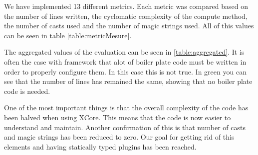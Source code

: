 		We have implemented 13 different metrics. Each metric was compared based on
the number of lines written, the cyclomatic complexity of the compute method,
the number of casts used and the number of magic strings used. All of this
values can be seen in table \ref{table:metricMesure}.

		The aggregated values of the evaluation can be seen in \ref{table:aggregated}. 
It is often the case with framework that alot of boiler plate code must be
written in order to properly configure them. In this case this is not true. In
green you can see that the number of lines has remained the same, showing that no boiler plate code is 
needed.  

		One of the most important things is that the overall complexity of the code
has been halved when using XCore. This means that the code is now easier to
understand and maintain. Another confirmation of this is that number of casts and magic strings
has been reduced to zero. Our goal for getting rid of this elements and having
statically typed plugins has been reached.
		
\begin{table}[h]
\centering
\caption{Aggregated values of the comparison. The relevant values have been
highlighted}
\label{table:aggregated}
\end{table}		


